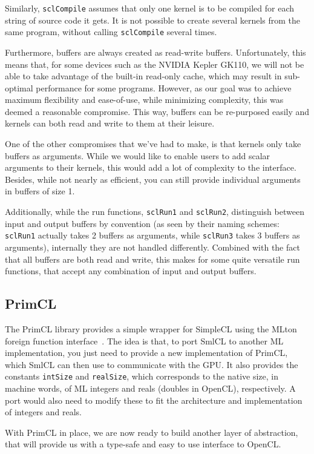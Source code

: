 Similarly, \texttt{sclCompile} assumes that only one kernel is to be
compiled for each string of source code it gets. It is not possible to
create several kernels from the same program, without calling
\texttt{sclCompile} several times.

Furthermore, buffers are always created as read-write
buffers. Unfortunately, this means that, for some devices such as the
NVIDIA Kepler GK110, we will not be able to take advantage of the
built-in read-only cache, which may result in sub-optimal performance
for some programs. However, as our goal was to achieve maximum
flexibility and ease-of-use, while minimizing complexity, this was
deemed a reasonable compromise. This way, buffers can be re-purposed
easily and kernels can both read and write to them at their leisure.

One of the other compromises that we've had to make, is that kernels
only take buffers as arguments. While we would like to enable users to
add scalar arguments to their kernels, this would add a lot of
complexity to the interface. Besides, while not nearly as efficient,
you can still provide individual arguments in buffers of size 1.

Additionally, while the run functions, \texttt{sclRun1} and
\texttt{sclRun2}, distinguish between input and output buffers by
convention (as seen by their naming schemes: \texttt{sclRun1} actually
takes 2 buffers as arguments, while \texttt{sclRun3} takes 3 buffers
as arguments), internally they are not handled differently. Combined
with the fact that all buffers are both read and write, this makes for
some quite versatile run functions, that accept any combination of
input and output buffers.

\subsection{PrimCL}

The PrimCL library provides a simple wrapper for SimpleCL using the
MLton foreign function interface~\cite{ffi}. The idea is that, to port
SmlCL to another ML implementation, you just need to provide a new
implementation of PrimCL, which SmlCL can then use to communicate with
the GPU. It also provides the constants \texttt{intSize} and
\texttt{realSize}, which corresponds to the native size, in machine
words, of ML integers and reals (doubles in OpenCL), respectively. A
port would also need to modify these to fit the architecture and
implementation of integers and reals.

With PrimCL in place, we are now ready to build another layer of
abstraction, that will provide us with a type-safe and easy to use
interface to OpenCL.
